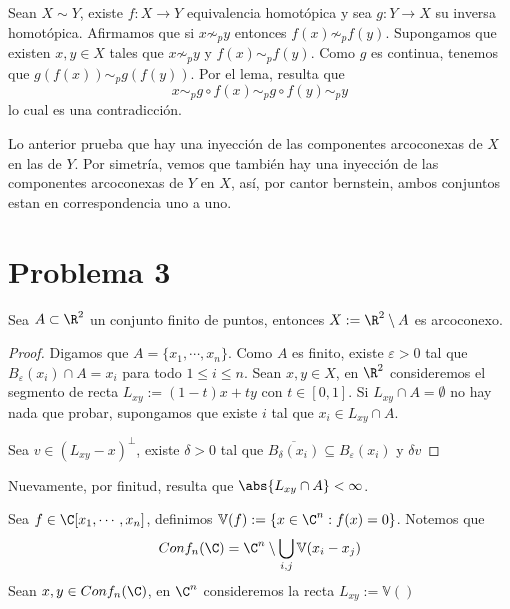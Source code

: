 \documentclass{article}
\begin{document}
\noindent Sean $X\sim Y$, existe $f:X\to Y$ equivalencia homotópica y sea $g:Y\to X$ su inversa 
homotópica. Afirmamos que si $x\not\sim_{p}y$ entonces $f(x)\not\sim_{p}f(y)$. Supongamos que 
existen $x,y\in X$ tales que $x\not\sim_{p}y$ y $f(x)\sim_{p}f(y)$. Como $g$ es continua, tenemos
que $g(f(x))\sim_{p}g(f(y))$. Por el lema, resulta que
\begin{equation*}
    x\sim_{p}g\circ f(x)\sim_{p}g\circ f(y)\sim_{p}y
\end{equation*}
lo cual es una contradicción.

\vspace{2mm}
\noindent Lo anterior prueba que hay una inyección de las componentes arcoconexas de $X$ en las de
$Y$. Por simetría, vemos que también hay una inyección de las componentes arcoconexas de $Y$ en 
$X$, así, por cantor bernstein, ambos conjuntos estan en correspondencia uno a uno.

\section*{Problema 3}
\begin{lema}
    Sea $A\subset\R^{2}$ un conjunto finito de puntos, entonces $X:=\R^{2}\setminus A$ es 
    arcoconexo.
\end{lema}
\begin{proof}
    Digamos que $A=\{x_{1},\cdots,x_{n}\}$. Como $A$ es finito, existe $\varepsilon>0$ tal que 
    $B_{\varepsilon}(x_{i})\cap A=x_{i}$ para todo $1\leq i\leq n$. Sean $x,y\in X$, en $\R^{2}$ 
    consideremos el segmento de recta $L_{xy}:=(1-t)x+ty$ con $t\in[0,1]$. Si
    $L_{xy}\cap A=\emptyset$ no hay nada que probar, supongamos que existe $i$ tal que 
    $x_{i}\in L_{xy}\cap A$.

    \vspace{2mm}
    \noindent Sea $v\in (L_{xy}-x)^{\perp}$, existe $\delta>0$ tal que $\overline{B_{\delta}(x_{i})}
    \subseteq B_{\varepsilon}(x_{i})$ y $\delta v$
\end{proof}

Nuevamente, por 
    finitud, resulta que $\abs{L_{xy}\cap A}<\infty$.

Sea $f\in\C[x_{1},\cdots,x_{n}]$, definimos $\mathbb{V}(f):=\{x\in\C^{n}:f(x)=0\}$. Notemos que
\begin{equation*}
    Conf_{n}(\C)=\C^{n}\setminus\bigcup_{i,j}\mathbb{V}(x_{i}-x_{j})
\end{equation*}
Sean $x,y\in Conf_{n}(\C)$, en $\C^{n}$ consideremos la recta $L_{xy}:=\mathbb{V}()$
\end{document}
